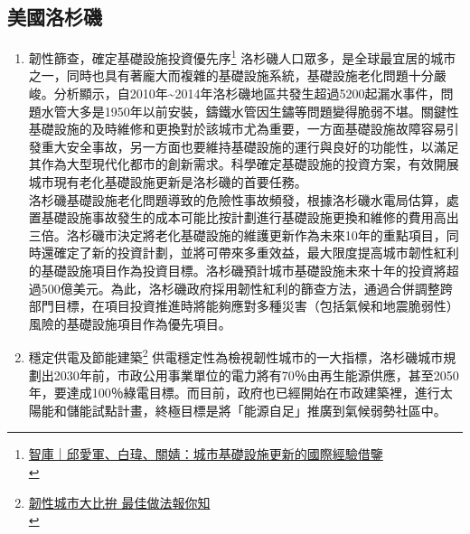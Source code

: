 \documentclass[a4paper,12pt]{article}
\begin{document}
\subsection{美國洛杉磯}
\label{sec:org4df3eff}
\begin{enumerate}
\item 韌性篩查，確定基礎設施投資優先序\footnote{\href{https://news.sina.com.tw/article/20200503/35052898.html}{智庫｜邱愛軍、白瑋、關婧：城市基礎設施更新的國際經驗借鑒}\\\label{orgd1795b6}}
\label{sec:orgadec713}
洛杉磯人口眾多，是全球最宜居的城市之一，同時也具有著龐大而複雜的基礎設施系統，基礎設施老化問題十分嚴峻。分析顯示，自2010年\textasciitilde{}2014年洛杉磯地區共發生超過5200起漏水事件，問題水管大多是1950年以前安裝，鑄鐵水管因生鏽等問題變得脆弱不堪。關鍵性基礎設施的及時維修和更換對於該城市尤為重要，一方面基礎設施故障容易引發重大安全事故，另一方面也要維持基礎設施的運行與良好的功能性，以滿足其作為大型現代化都市的創新需求。科學確定基礎設施的投資方案，有效開展城市現有老化基礎設施更新是洛杉磯的首要任務。\\

洛杉磯基礎設施老化問題導致的危險性事故頻發，根據洛杉磯水電局估算，處置基礎設施事故發生的成本可能比按計劃進行基礎設施更換和維修的費用高出三倍。洛杉磯市決定將老化基礎設施的維護更新作為未來10年的重點項目，同時還確定了新的投資計劃，並將可帶來多重效益，最大限度提高城市韌性紅利的基礎設施項目作為投資目標。洛杉磯預計城市基礎設施未來十年的投資將超過500億美元。為此，洛杉磯政府採用韌性紅利的篩查方法，通過合併調整跨部門目標，在項目投資推進時將能夠應對多種災害（包括氣候和地震脆弱性）風險的基礎設施項目作為優先項目。\\

\item 穩定供電及節能建築\footnote{\href{https://www.delta-foundation.org.tw/blogdetail/3021}{韌性城市大比拚 最佳做法報你知}\\}
\label{sec:orga345dda}
供電穩定性為檢視韌性城市的一大指標，洛杉磯城市規劃出2030年前，市政公用事業單位的電力將有70％由再生能源供應，甚至2050年，要達成100％綠電目標。而目前，政府也已經開始在市政建築裡，進行太陽能和儲能試點計畫，終極目標是將「能源自足」推廣到氣候弱勢社區中。\\
\end{enumerate}
\end{document}
